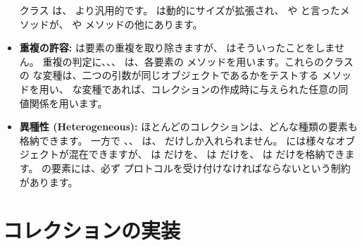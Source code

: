 \documentclass[a4paper,10pt,twoside]{book}
\begin{document}
\begin{itemize}
         クラス は、 より汎用的です。 は動的にサイズが拡張され、 や  と言ったメソッドが、 や  メソッドの他にあります。
  
  \item {\bf 重複の許容:}
  	 は要素の重複を取り除きますが、 はそういったことをしません。
	重複の判定に、、、 は、各要素の \ct{=} メソッドを用います。これらのクラスの  な変種は、二つの引数が同じオブジェクトであるかをテストする \ct{==} メソッドを用い、 な変種であれば、コレクションの作成時に与えられた任意の同値関係を用います。

  \item {\bf 異種性 (Heterogeneous):}
        ほとんどのコレクションは、どんな種類の要素も格納できます。
        一方で 、、 は、 だけしか入れられません。
         には様々なオブジェクトが混在できますが、 は  だけを、 は  だけを、 は  だけを格納できます。
	 の要素には、必ず  プロトコルを受け付けなければならないという制約があります。

\end{itemize}


\section{コレクションの実装}
\end{document}
